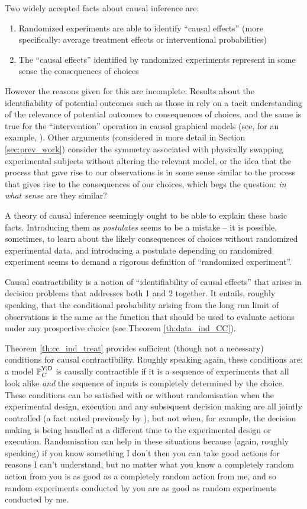 Two widely accepted facts about causal inference are:
\begin{enumerate}
    \item Randomized experiments are able to identify ``causal effects'' (more specifically: average treatment effects or interventional probabilities)
    \item The ``causal effects'' identified by randomized experiments represent in some sense the consequences of choices
\end{enumerate}
However the reasons given for this are incomplete. Results about the identifiability of potential outcomes such as those in \citet{rubin_causal_2005,imbens_causal_2015} rely on a tacit understanding of the relevance of potential outcomes to consequences of choices, and the same is true for the ``intervention'' operation in causal graphical models (see, for an example, \citet[Chap. 4]{pearl_book_2018}). Other arguments (considered in more detail in Section \ref{sec:prev_work}) consider the symmetry associated with physically swapping experimental subjects without altering the relevant model, or the idea that the process that gave rise to our observations is in some sense similar to the process that gives rise to the consequences of our choices, which begs the question: \emph{in what sense} are they similar?

A theory of causal inference seemingly ought to be able to explain these basic facts. Introducing them as \emph{postulates} seems to be a mistake -- it is possible, sometimes, to learn about the likely consequences of choices without randomized experimental data, and introducing a postulate depending on randomized experiment seems to demand a rigorous definition of ``randomized experiment''.

Causal contractibility is a notion of ``identifiability of causal effects'' that arises in decision problems that addresses both 1 and 2 together. It entails, roughly speaking, that the conditional probability arising from the long run limit of observations is the same as the function that should be used to evaluate actions under any prospective choice (see Theorem \ref{th:data_ind_CC}).

Theorem \ref{th:cc_ind_treat} provides sufficient (though not a necessary) conditions for causal contractibility. Roughly speaking again, these conditions are: a model $\mathbb{P}_C^{\mathsf{Y}|\mathsf{D}}$ is causally contractible if it is a sequence of experiments that all look alike \emph{and} the sequence of inputs is completely determined by the choice. These conditions can be satisfied with or without randomisation when the experimental design, execution and any subsequent decision making are all jointly controlled (a fact noted previously by \citet{kasy_why_2016}), but not when, for example, the decision making is being handled at a different time to the experimental design or execution. Randomisation can help in these situations because (again, roughly speaking) if you know something I don't then you can take good actions for reasons I can't understand, but no matter what you know a completely random action from you is as good as a completely random action from me, and so random experiments conducted by you are as good as random experiments conducted by me.

